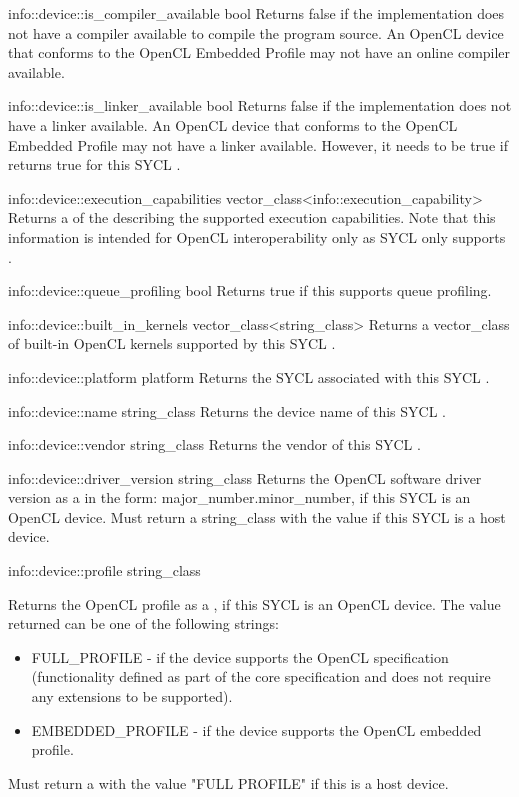   \addInfoRow
  {info::device::is_compiler_available}
  {bool}
  {
  Returns false if the implementation does not have a compiler available to
  compile the program source. An OpenCL device that conforms to the OpenCL Embedded Profile may not have an online compiler available.
  }

  \addInfoRow
  {info::device::is_linker_available}
  {bool}
  {
  Returns false if the implementation does not have a linker available.  An
  OpenCL device that conforms to the OpenCL Embedded Profile may not have a linker
  available. However, it needs to be true if  returns true for this SYCL .
  }
  
    \addInfoRow
  {info::device::execution_capabilities}
  {vector_class<info::execution_\-capability>}
  {
    Returns a  of the  describing the supported execution capabilities.
    Note that this information is intended for OpenCL interoperability only as  SYCL only supports .
    }
    
    \addInfoRow
    {info::device::queue_profiling}
    {bool}
    {
      Returns true if this  supports queue profiling.
    }

  \addInfoRow
  {info::device::built_in_kernels}
  {vector_class<string_class>}
  { Returns a vector_class of built-in OpenCL
  kernels supported by this SYCL .
  }

  \addInfoRow
  {info::device::platform}
  {platform}
  {Returns the SYCL  associated with this SYCL .}

  \addInfoRow
  {info::device::name}
  {string_class}
  {Returns the device name of this SYCL .}

  \addInfoRow
  {info::device::vendor}
  {string_class}
  {Returns the vendor of this SYCL .}

  \addInfoRow
  {info::device::driver_version}
  {string_class}
  { Returns the OpenCL software driver version as a  in the form: major_number.minor_number, if this SYCL  is an OpenCL device. Must return a string_class with the value  if this SYCL  is a host device.
  }

  \addInfoRow
  {info::device::profile}
  {string_class}
  {
  Returns the OpenCL profile as a , if this SYCL  is an OpenCL device. The value returned can be one of the following strings:
  \begin{itemize}
    \item FULL_PROFILE - if the device supports
    the OpenCL specification (functionality
    defined as part of the core specification and
    does not require any extensions to be
    supported).
    \item EMBEDDED_PROFILE - if the device
    supports the OpenCL embedded profile.
  \end{itemize}
  Must return a  with the value "FULL PROFILE" if this is a host device.
  }

